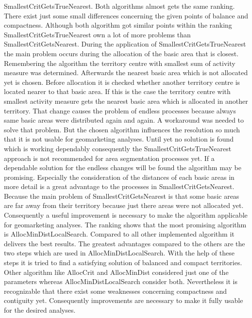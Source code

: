 SmallestCritGetsTrueNearest. Both algorithms almost gets the same ranking. There exist just some small differences concerning the given points of balance and compactness. Although both algorithm got similar points within the ranking SmallestCritGetsTrueNearest own a lot of more problems than SmallestCritGetsNearest. During the application of SmallestCritGetsTrueNearest the main problem occurs during the allocation of the basic area that is closest. Remembering the algorithm the territory centre with smallest sum of activity measure was determined. Afterwards the nearest basic area which is not allocated yet is chosen. Before allocation it is checked whether another territory centre is located nearer to that basic area. If this is the case the territory centre with smallest activity measure gets the nearest basic area which is allocated in another territory. That change causes the problem of endless processes because always same basic areas were distributed again and again. A workaround was needed to solve that problem. But the chosen algorithm influences the resolution so much that it is not usable for geomarketing analyses. Until yet no solution is found which is working dependably consequently the SmallestCritGetsTrueNearest approach is not recommended for area segmentation processes yet. If a dependable solution for the endless changes will be found the algorithm may be promising. Especially the consideration of the distances of each basic areas in more detail is a great advantage to the processes in SmallestCritGetsNearest. Because the main problem of SmallestCritGetsNearest is that some basic areas are far away from their territory because just there areas were not allocated yet. Consequently a useful improvement is necessary to make the algorithm applicable for geomarketing analyses. The ranking shows that the most promising algorithm is AllocMinDistLocalSearch. Compared to all other implemented algorithm it delivers the best results. The greatest advantages compared to the others are the two steps which are used in AllocMinDistLocalSearch. With the help of these steps it is tried to find a satisfying solution of balanced and compact territories. Other algorithm like AllocCrit and AllocMinDist considered just one of the parameters whereas AllocMinDistLocalSearch consider both. Nevertheless it is recognizable that there exist some weaknesses concerning compactness and contiguity yet. Consequently improvements are necessary to make it fully usable for the desired analyses. 

